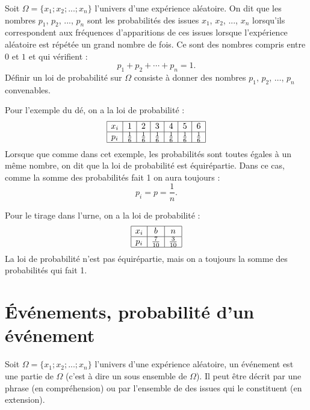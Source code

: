 \documentclass[a4paper,11pt,DIV12,BCOR0mm]{scrartcl}
\begin{document}
\begin{definition}
 Soit $\Omega=\{x_1;x_2;...;x_n\}$ l'univers d'une expérience aléatoire. On dit que les 
nombres $p_1$, $p_2$, ..., $p_n$ sont les probabilités des issues $x_1$, $x_2$, ..., $x_n$
lorsqu'ils correspondent aux fréquences d'apparitions de ces issues lorsque l'expérience aléatoire est répétée 
un grand nombre de fois. Ce sont des nombres compris entre $0$ et $1$ et qui vérifient :
\[
 p_1+p_2+\cdots+p_n=1.
\]
Définir un loi de probabilité sur $\Omega$ consiste à donner des nombres $p_1$, $p_2$, $\dots$, $p_n$
convenables.
\end{definition}
\begin{exemple}
 Pour l'exemple du dé, on a la loi de probabilité :
\renewcommand{\arraystretch}{2}
\[
 \begin{array}{|*{7}{c|}}
  \hline
  x_i	&	1	&	2	&	3	&	4	&	5	&	6\\\hline
  p_i	&	\frac16	&	\frac16	&	\frac16	&	\frac16	&	\frac16	&	\frac16\\\hline
 \end{array}
\]
Lorsque que comme dans cet exemple, les probabilités sont toutes égales à un même nombre, on dit
que la loi de probabilité est équirépartie. Dans ce cas, comme la somme des probabilités fait 1
on aura toujours :
\[
 p_i=p=\frac1n.
\]
\end{exemple}
\begin{exemple}
 Pour le tirage dans l'urne, on a la loi de probabilité :
\renewcommand{\arraystretch}{2}
\[
 \begin{array}{|*{7}{c|}}
  \hline
  x_i	&	b		&	n		\\\hline
  p_i	&	\frac{7}{10}	&	\frac{3}{10}	\\\hline
 \end{array}
\]
La loi de probabilité n'est pas équirépartie, mais on a toujours
la somme des probabilités qui fait 1. 
\end{exemple}



\section{\'Evénements, probabilité d'un événement}
\begin{definition}
 Soit $\Omega=\{x_1;x_2;...;x_n\}$ l'univers d'une expérience aléatoire,
un événement est une partie de $\Omega$ (c'est à dire un sous ensemble
de $\Omega$). Il peut être décrit par une phrase (en compréhension) ou par l'ensemble de 
des issues qui le constituent (en extension).
\end{definition}
\end{document}
